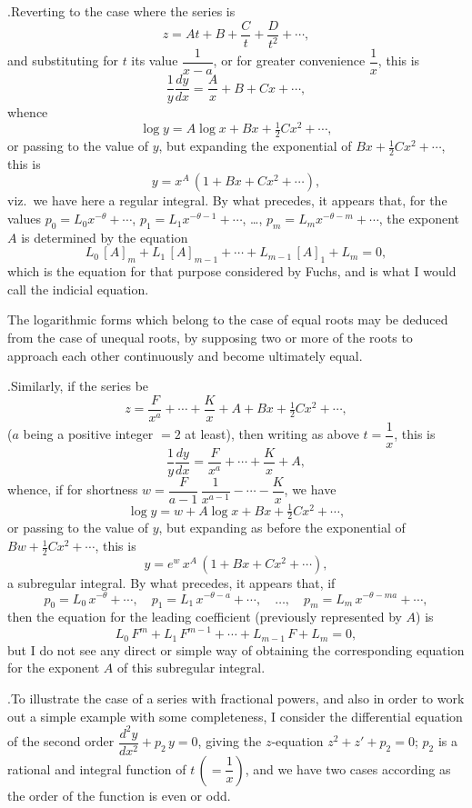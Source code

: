 \documentclass[11pt]{article}
\begin{document}
\medskip

.\quad Reverting to the case where the series is
\[
z = At + B + \frac{C}{t} + \frac{D}{t^{2}} + \cdots,
\]
and substituting for $t$ its value $\dfrac{1}{x-a}$, or for greater convenience $\dfrac{1}{x}$, this is
\[
\frac{1}{y}\frac{dy}{dx} = \frac{A}{x} + B + Cx + \cdots,
\]
whence
\[
\log y = A\log x + Bx + \tfrac{1}{2}Cx^{2} + \cdots,
\]
or passing to the value of $y$, but expanding the exponential of $Bx + \tfrac{1}{2}Cx^{2} + \cdots$, this is
\[
y = x^{A}\,(1 + Bx + Cx^{2} + \cdots),
\]
viz.\ we have here a regular integral. By what precedes, it appears that, for the values $p_{0} = L_{0}x^{-\theta} + \cdots$, $p_{1} = L_{1}x^{-\theta-1} + \cdots$, \ldots, $p_{m} = L_{m}x^{-\theta-m} + \cdots$, the exponent $A$ is determined by the equation
\[
L_{0}\,[A]_{m} + L_{1}\,[A]_{m-1} + \cdots + L_{m-1}\,[A]_{1} + L_{m} = 0,
\]
which is the equation for that purpose considered by Fuchs, and is what I would call the indicial equation.

The logarithmic forms which belong to the case of equal roots may be deduced from the case of unequal roots, by supposing two or more of the roots to approach each other continuously and become ultimately equal.

\medskip

.\quad Similarly, if the series be
\[
z = \frac{F}{x^{a}} + \cdots + \frac{K}{x} + A + Bx + \tfrac{1}{2}Cx^{2} + \cdots,
\]
($a$ being a positive integer $=2$ at least), then writing as above $t = \dfrac{1}{x}$, this is
\[
\frac{1}{y}\frac{dy}{dx} = \frac{F}{x^{a}} + \cdots + \frac{K}{x} + A,
\]
whence, if for shortness $w = \dfrac{F}{a-1}\,\dfrac{1}{x^{a-1}} - \cdots - \dfrac{K}{x}$, we have
\[
\log y = w + A\log x + Bx + \tfrac{1}{2}Cx^{2} + \cdots,
\]
or passing to the value of $y$, but expanding as before the exponential of $Bw + \tfrac{1}{2}Cx^{2} + \cdots$, this is
\[
y = e^{w}\,x^{A}\,(1 + Bx + Cx^{2} + \cdots),
\]
a subregular integral. By what precedes, it appears that, if
\[
p_{0} = L_{0}\,x^{-\theta} + \cdots,\quad p_{1} = L_{1}\,x^{-\theta-a} + \cdots,\quad \ldots,\quad p_{m} = L_{m}\,x^{-\theta-ma} + \cdots,
\]
then the equation for the leading coefficient (previously represented by $A$) is
\[
L_{0}\,F^{m} + L_{1}\,F^{m-1} + \cdots + L_{m-1}\,F + L_{m} = 0,
\]
but I do not see any direct or simple way of obtaining the corresponding equation for the exponent $A$ of this subregular integral.

\medskip

.\quad To illustrate the case of a series with fractional powers, and also in order to work out a simple example with some completeness, I consider the differential equation of the second order $\dfrac{d^{2}y}{dx^{2}} + p_{2}\,y = 0$, giving the $z$-equation $z^{2} + z' + p_{2} = 0$; $p_{2}$ is a rational and integral function of $t\,(=\dfrac{1}{x})$, and we have two cases according as the order of the function is even or odd.
\end{document}
